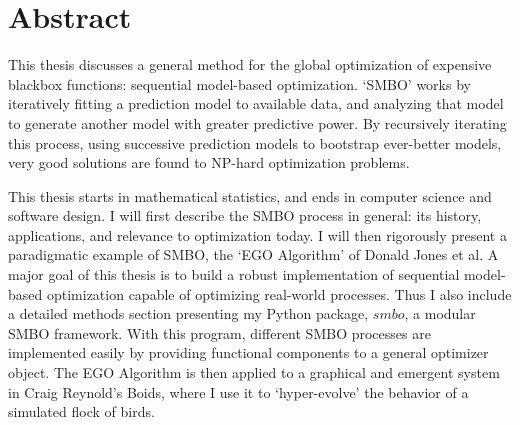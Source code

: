 \chapter*{Abstract}

This thesis discusses a general method for the global optimization of expensive blackbox functions: sequential model-based optimization. `SMBO' works by iteratively fitting a prediction model to available data, and analyzing that model to generate another model with greater predictive power. By recursively iterating this process, using successive prediction models to bootstrap ever-better models, very good solutions are found to NP-hard optimization problems.

This thesis starts in mathematical statistics, and ends in computer science and software design. I will first describe the SMBO process in general: its history, applications, and relevance to optimization today. I will then rigorously present a paradigmatic example of SMBO, the `EGO Algorithm' of Donald Jones et al. A major goal of this thesis is to build a robust implementation of sequential model-based optimization capable of optimizing real-world processes. Thus I also include a detailed methods section presenting my Python package, $smbo$, a modular SMBO framework. With this program, different SMBO processes are implemented easily by providing functional components to a general optimizer object. The EGO Algorithm is then applied to a graphical and emergent system in Craig Reynold's Boids, where I use it to `hyper-evolve' the behavior of a simulated flock of birds.